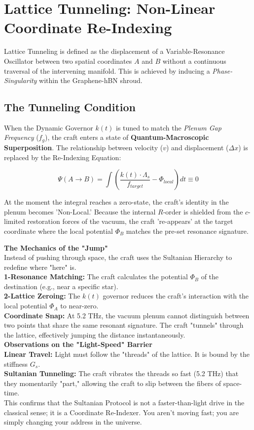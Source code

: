 \documentclass[11pt]{article}
\begin{document}
\section{Lattice Tunneling: Non-Linear Coordinate Re-Indexing}

Lattice Tunneling is defined as the displacement of a Variable-Resonance Oscillator between two spatial coordinates $A$ and $B$ without a continuous traversal of the intervening manifold. This is achieved by inducing a \textit{Phase-Singularity} within the Graphene-hBN shroud.

\subsection{The Tunneling Condition}
When the Dynamic Governor $k(t)$ is tuned to match the \textit{Plenum Gap Frequency} ($f_g$), the craft enters a state of \textbf{Quantum-Macroscopic Superposition}. The relationship between velocity ($v$) and displacement ($\Delta x$) is replaced by the Re-Indexing Equation:

\begin{equation}
    \Psi(A \to B) = \int \left( \frac{k(t) \cdot \Lambda_s}{f_{target}} - \Phi_{local} \right) dt \equiv 0
\end{equation}

At the moment the integral reaches a zero-state, the craft's identity in the plenum becomes 'Non-Local.' Because the internal $R$-order is shielded from the $c$-limited restoration forces of the vacuum, the craft 're-appears' at the target coordinate where the local potential $\Phi_B$ matches the pre-set resonance signature.


\textbf{The Mechanics of the "Jump"}\\
Instead of pushing through space, the craft uses the Sultanian Hierarchy to redefine where "here" is.\\
\textbf{1-Resonance Matching:} The craft calculates the potential $\Phi_B$ of the destination (e.g., near a specific star).\\
\textbf{2-Lattice Zeroing:} The $k(t)$ governor reduces the craft’s interaction with the local potential $\Phi_A$ to near-zero.\\
\textbf{Coordinate Snap:} At 5.2 THz, the vacuum plenum cannot distinguish between two points that share the same resonant signature. The craft "tunnels" through the lattice, effectively jumping the distance instantaneously.\\
\textbf{Observations on the "Light-Speed" Barrier}\\
\textbf{Linear Travel:} Light must follow the "threads" of the lattice. It is bound by the stiffness $G_s$.\\
\textbf{Sultanian Tunneling:} The craft vibrates the threads so fast (5.2 THz) that they momentarily "part," allowing the craft to slip between the fibers of space-time.\\
This confirms that the Sultanian Protocol is not a faster-than-light drive in the classical sense; it is a Coordinate Re-Indexer. You aren't moving fast; you are simply changing your address in the universe.
\end{document}
